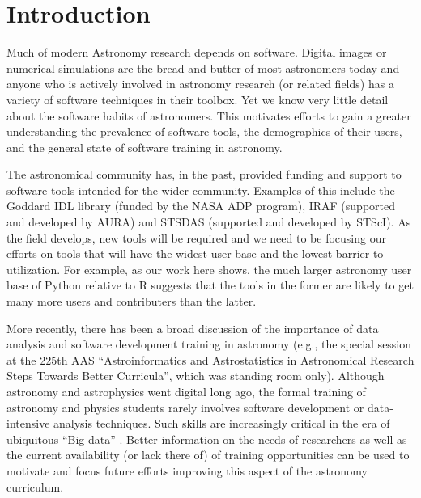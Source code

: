 \section{Introduction}
\label{sec:intro}

Much of modern Astronomy research depends on software. Digital images or numerical simulations are the bread and butter of most astronomers today and anyone who is actively involved in astronomy research (or related fields) has a variety of software techniques in their toolbox. Yet we know very little detail about the software habits of astronomers. This motivates efforts to gain a greater understanding the prevalence of software tools, the demographics of their users, and the general state of software training in astronomy.

The astronomical community has, in the past, provided funding and support to software tools intended for the wider community. Examples of this include the Goddard IDL library (funded by the NASA ADP program), IRAF (supported and developed by AURA) and STSDAS (supported and developed by STScI). As the field develops, new tools will be required and we need to be focusing our efforts on tools that will have the widest user base and the lowest barrier to utilization. For example, as our work here shows, the much larger astronomy user base of Python relative to R suggests that the tools in the former are likely to get many more users and contributers than the latter. 

More recently, there has been a broad discussion of the importance of data analysis and software development training in astronomy (e.g., the special session at the 225th AAS ``Astroinformatics and Astrostatistics in Astronomical Research Steps Towards Better Curricula'', which was standing room only). Although astronomy and astrophysics went digital long ago, the formal training of astronomy and physics students rarely involves software development or data-intensive analysis techniques. Such skills are increasingly critical in the era of ubiquitous ``Big data'' \cite[e.g., ][, or the \href{http://www.noao.edu/meetings/bigdata/}{2015 NOAO Big Data conference}]{Berriman_2011}. Better information on the needs of researchers as well as the current availability (or lack there of) of training opportunities can be used to motivate and focus future efforts improving this aspect of the astronomy curriculum. 


